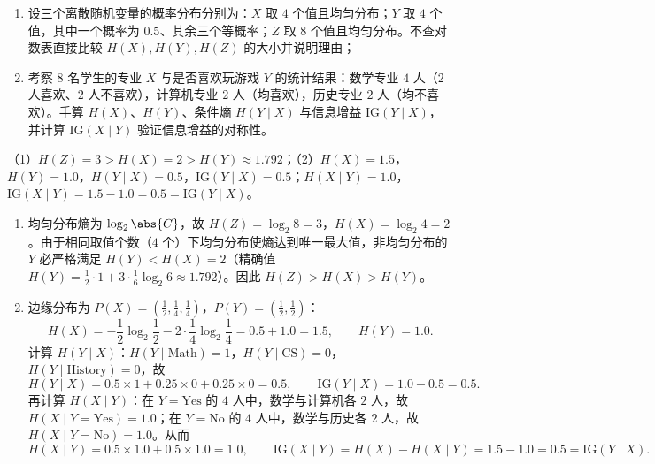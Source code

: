 \begin{exercise}[title={信息熵、条件熵与信息增益对称性手算},level=standard,points=15,tags={信息熵,条件熵,信息增益}]
\begin{enumerate}
  \item 设三个离散随机变量的概率分布分别为：$X$ 取 $4$ 个值且均匀分布；$Y$ 取 $4$ 个值，其中一个概率为 $0.5$、其余三个等概率；$Z$ 取 $8$ 个值且均匀分布。不查对数表直接比较 $H(X), H(Y), H(Z)$ 的大小并说明理由；
  \item 考察 $8$ 名学生的专业 $X$ 与是否喜欢玩游戏 $Y$ 的统计结果：数学专业 $4$ 人（$2$ 人喜欢、$2$ 人不喜欢），计算机专业 $2$ 人（均喜欢），历史专业 $2$ 人（均不喜欢）。手算 $H(X)$、$H(Y)$、条件熵 $H(Y\mid X)$ 与信息增益 $\mathrm{IG}(Y\mid X)$，并计算 $\mathrm{IG}(X\mid Y)$ 验证信息增益的对称性。
\end{enumerate}
\begin{answer}
（1）$H(Z) = 3 > H(X) = 2 > H(Y) \approx 1.792$；（2）$H(X) = 1.5$，$H(Y) = 1.0$，$H(Y\mid X) = 0.5$，$\mathrm{IG}(Y\mid X) = 0.5$；$H(X\mid Y) = 1.0$，$\mathrm{IG}(X\mid Y) = 1.5 - 1.0 = 0.5 = \mathrm{IG}(Y\mid X)$。
\end{answer}
\begin{solution}
\begin{enumerate}
  \item 均匀分布熵为 $\log_2\abs{C}$，故 $H(Z) = \log_2 8 = 3$，$H(X) = \log_2 4 = 2$。由于相同取值个数（$4$ 个）下均匀分布使熵达到唯一最大值，非均匀分布的 $Y$ 必严格满足 $H(Y) < H(X) = 2$（精确值 $H(Y) = \frac{1}{2}\cdot 1 + 3\cdot\frac{1}{6}\log_2 6 \approx 1.792$）。因此 $H(Z) > H(X) > H(Y)$。
  \item 边缘分布为 $P(X) = (\frac{1}{2}, \frac{1}{4}, \frac{1}{4})$，$P(Y) = (\frac{1}{2}, \frac{1}{2})$：
  \[
    H(X) = -\frac{1}{2}\log_2\frac{1}{2} - 2\cdot\frac{1}{4}\log_2\frac{1}{4} = 0.5 + 1.0 = 1.5,\qquad
    H(Y) = 1.0.
  \]
  计算 $H(Y\mid X)$：$H(Y\mid \text{Math}) = 1$，$H(Y\mid \text{CS}) = 0$，$H(Y\mid \text{History}) = 0$，故
  \[
    H(Y\mid X) = 0.5\times 1 + 0.25\times 0 + 0.25\times 0 = 0.5,\qquad
    \mathrm{IG}(Y\mid X) = 1.0 - 0.5 = 0.5.
  \]
  再计算 $H(X\mid Y)$：在 $Y=\text{Yes}$ 的 $4$ 人中，数学与计算机各 $2$ 人，故 $H(X\mid Y=\text{Yes}) = 1.0$；在 $Y=\text{No}$ 的 $4$ 人中，数学与历史各 $2$ 人，故 $H(X\mid Y=\text{No}) = 1.0$。从而
  \[
    H(X\mid Y) = 0.5\times 1.0 + 0.5\times 1.0 = 1.0,\qquad
    \mathrm{IG}(X\mid Y) = H(X) - H(X\mid Y) = 1.5 - 1.0 = 0.5 = \mathrm{IG}(Y\mid X).
  \]
\end{enumerate}
\end{solution}
\end{exercise}


